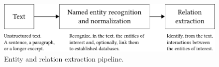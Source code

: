 \begin{figure}[!tb]
\begin{center}
\includegraphics[width=\textwidth]{img/re/v1/img.pdf}
\caption{Entity and relation extraction pipeline.}
\label{fig:re}
\end{center}
\end{figure}
